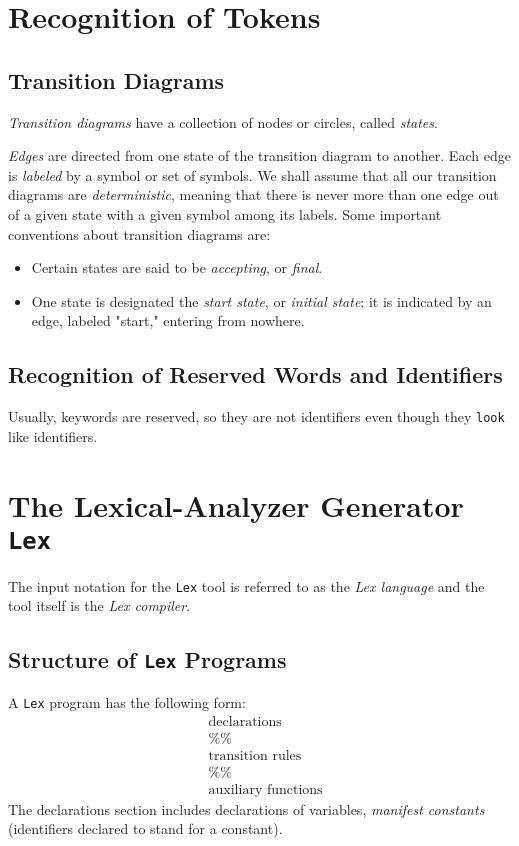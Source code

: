 \documentclass[12pt,a4paper,twoside,openany]{book}
\begin{document}
\section{Recognition of Tokens}
\subsection{Transition Diagrams}

\textit{Transition diagrams} have a collection of nodes or circles, called \textit{states}.

\textit{Edges} are directed from one state of the transition diagram to another. Each edge is \textit{labeled} by a symbol or set of symbols. We shall assume that all our transition diagrams are \textit{deterministic}, meaning that there is never more than one edge out of a given state with a given symbol among its labels. Some important conventions about transition diagrams are:
\begin{itemize}
    \item Certain states are said to be \textit{accepting}, or \textit{final}.
    \item One state is designated the \textit{start state}, or \textit{initial state}; it is indicated by an edge, labeled "start," entering from nowhere.
\end{itemize}

\subsection{Recognition of Reserved Words and Identifiers}

Usually, keywords are reserved, so they are not identifiers even though they \verb|look| like identifiers.

\section{The Lexical-Analyzer Generator \texttt{Lex}}

The input notation for the \verb|Lex| tool is referred to as the \textit{Lex language} and the tool itself is the \textit{Lex compiler}.

\subsection{Structure of \texttt{Lex} Programs}

A \verb|Lex| program has the following form:
\begin{equation*}
    \begin{aligned}&\text{declarations}\\&\%\%\\&\text{transition rules}\\&\%\%\\&\text{auxiliary functions}\end{aligned}
\end{equation*}
The declarations section includes declarations of variables, \textit{manifest constants} (identifiers declared to stand for a constant).
\end{document}
